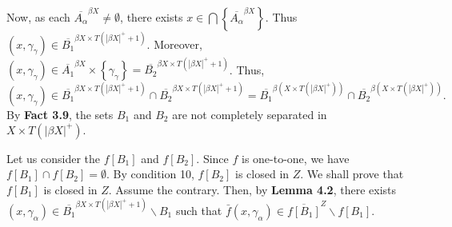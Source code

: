\documentclass{article}
\begin{document}
																																																				\vskip 15pt

																																																				Now, as each $\overline{A_\alpha}^{\beta X} \neq \emptyset$, there exists $x\in \bigcap \left\{\overline{A_\alpha}^{\beta X}\right\}.$ Thus $(x,\gamma_\gamma)\in \overline{B_1}^{\beta X \times T(|\beta X|^+ +1)}$. Moreover, $(x, \gamma_\gamma)\in \overline{A_1}^{\beta X} \times \left\{\gamma_\gamma\right\}= \overline{B_2}^{\beta X \times T(|\beta X|^+ +1)}$. Thus, $(x,\gamma_\gamma)\in \overline{B_1}^{\beta X\times T(|\beta X|^+ +1)} \cap \overline{B_2}^{\beta X\times T(|\beta X|^+ +1)}=\overline{B_1}^{\beta\left( X\times T(|\beta X|^+)\right)} \cap \overline{B_2}^{\beta \left(X\times T(|\beta X|^+)\right)}.$ By \textbf{Fact 3.9}, the sets $B_1$ and $B_2$ are not completely separated in $X\times T(|\beta X|^+).$

																																																				\vskip 15pt


																																																				Let us consider the $f\left[B_1\right]$ and $f\left[B_2\right].$ Since $f$ is one-to-one, we have $f\left[B_1\right] \cap f\left[B_2\right]=\emptyset.$ 
																																																				By condition 10, $f\left[B_2\right]$ is closed in $Z$. We shall prove that $f\left[B_1\right]$ is closed in $Z$. Assume the contrary. Then, by \textbf{Lemma 4.2}, there exists $(x,\gamma_\alpha)\in \overline{B_1}^{\beta X\times T(|\beta X|^+ +1)} \backslash B_1$ such that $\bar{f}(x,\gamma_\alpha)\in \overline{f\left[B_1\right]}^Z\backslash f\left[B_1\right].$ 
																																																				\vskip 15pt
\end{document}
